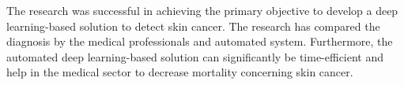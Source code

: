 The research was successful in achieving the primary objective to develop a deep learning-based solution to detect skin cancer. The research has compared the diagnosis by the medical professionals and automated system. Furthermore, the automated deep learning-based solution can significantly be time-efficient and help in the medical sector to decrease mortality concerning skin cancer. 